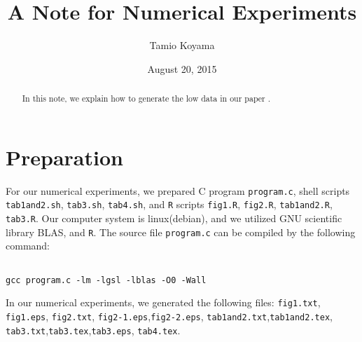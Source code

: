 \documentclass{article}
\title{A Note for Numerical Experiments}
\author{Tamio Koyama}
\date{August 20, 2015}
\begin{document}
\maketitle

\begin{abstract}
In this note, we explain how to generate the low data in our paper
\cite{koyama-takemura2}.
\end{abstract}

\section{Preparation}
For our numerical experiments, we prepared C program {\tt program.c}, 
shell scripts 
{\tt tab1and2.sh}, {\tt tab3.sh}, {\tt tab4.sh},
and {\tt R} scripts 
{\tt fig1.R}, {\tt fig2.R}, {\tt tab1and2.R}, {\tt tab3.R}.
Our computer system is linux(debian), and we utilized GNU scientific library
BLAS, and {\tt R}.
The source file {\tt program.c} can be compiled by the following command:
\begin{lstlisting}[style=BashInputStyle]

gcc program.c -lm -lgsl -lblas -O0 -Wall 
\end{lstlisting}

 
In our numerical experiments, we generated the following files:
{\tt fig1.txt}, {\tt fig1.eps},
{\tt fig2.txt}, {\tt fig2-1.eps},{\tt fig2-2.eps},
{\tt tab1and2.txt},{\tt tab1and2.tex},
{\tt tab3.txt},{\tt tab3.tex},{\tt tab3.eps},
{\tt tab4.tex}.
\end{document}
